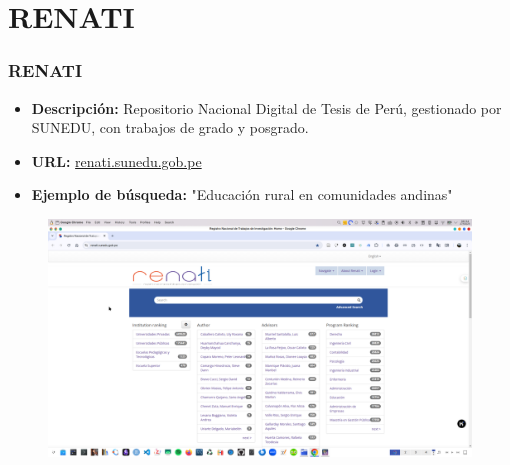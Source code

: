 \documentclass[
11pt, %
]{beamer}
\begin{document}
\section{RENATI}
\begin{frame}
	\frametitle{RENATI}
	\begin{itemize}
		\item \textbf{Descripción:} Repositorio Nacional Digital de Tesis de Perú, gestionado por SUNEDU, con trabajos de grado y posgrado.
		\item \textbf{URL:} \href{https://renati.sunedu.gob.pe}{renati.sunedu.gob.pe}
		\item \textbf{Ejemplo de búsqueda:} "Educación rural en comunidades andinas"
	\end{itemize}
			\begin{figure}
		\centering
		\includegraphics[width=0.9\linewidth]{images/renati.png}
		\label{fig:screenshot010}
	\end{figure}
\end{frame}

\end{document}
